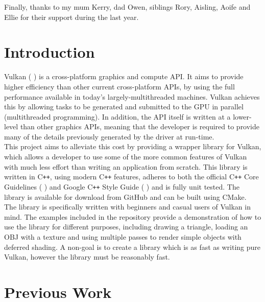 \documentclass[12pt]{report}
\newcommand{\citebu}[1]{(\citenoparen{#1})}
\newcommand{\citenoparen}[1]{\citeauthor{#1} \citeyear{#1}}
\newcommand{\citesoftware}[1]{(\citeauthor{#1} \citeyear{#1})}
\newcommand{\cpp}{C\texttt{++}}
\theoremstyle{definition}
\begin{document}
    Finally, thanks to my mum Kerry, dad Owen, siblings Rory, Aisling, Aoife and Ellie for
    their support during the last year. \\

  \tableofcontents

  \listoffigures

  \lstlistoflistings

  \chapter{Introduction}
    Vulkan \citesoftware{vulkan} is a cross-platform graphics and compute API.
    It aims to provide higher efficiency than other current
    cross-platform APIs, by using the full performance available in today's
    largely-multithreaded machines. Vulkan achieves this by allowing tasks to be
    generated and submitted to the GPU in parallel (multithreaded programming).
    In addition, the API itself is written at a lower-level than other graphics
    APIs, meaning that the developer is required to provide many of the details
    previously generated by the driver at run-time.\\

    This project aims to alleviate this cost by providing a wrapper library for
    Vulkan, which allows a developer to use some of the more common features of
    Vulkan with much less effort than writing an application from scratch. This
    library is written in \cpp{}, using modern \cpp{} features, adheres to both the
    official \cpp{} Core Guidelines \citebu{core_guidelines} and Google \cpp{} Style Guide \citebu{style_guide} and is fully unit
    tested. The library is available for download from GitHub and can be built
    using CMake.\\

    The library is specifically written with beginners and casual users of
    Vulkan in mind. The examples included in the repository provide a
    demonstration of how to use the library for different purposes, including
    drawing a triangle, loading an OBJ with a texture and using multiple passes
    to render simple objects with deferred shading. A non-goal is to create a
    library which is as fast as writing pure Vulkan, however the library
    must be reasonably fast.\\

  \chapter{Previous Work}
\end{document}
